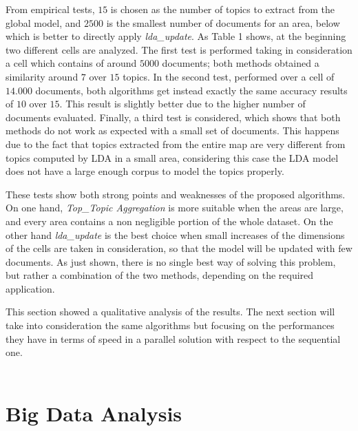 From empirical tests, $15$ is chosen as the number of topics to extract from the global model, and $2500$ is the smallest number of documents for an area, below which is better to directly apply \emph{lda\_update}. As Table 1 shows, at the beginning two different cells are analyzed. The first test is performed taking in consideration a cell which contains of around $5000$ documents; both methods obtained a similarity around $7$ over $15$ topics. In the second test, performed over a cell of $14.000$ documents, both algorithms get instead exactly the same accuracy results of $10$ over $15$. This result is slightly better due to the higher number of documents evaluated. Finally, a third test is considered, which shows that both methods do not work as expected with a small set of documents. This happens due to the fact that topics extracted from the entire map are very different from topics computed by LDA in a small area, considering this case the LDA model does not have a large enough corpus to model the topics properly. 

These tests show both strong points and weaknesses of the proposed algorithms. On one hand, \emph{Top\_Topic Aggregation} is more suitable when the areas are large, and every area contains a non negligible portion of the whole dataset. On the other hand \emph{lda\_update} is the best choice when small increases of the dimensions of the cells are taken in consideration, so that the model will be updated with few documents. As just shown, there is no single best way of solving this problem, but rather a combination of the two methods, depending on the required application. 

This section showed a qualitative analysis of the results. The next section will take into consideration the same algorithms but focusing on the performances they have in terms of speed in a parallel solution with respect to the sequential one.\\\\



\section{Big Data Analysis}

